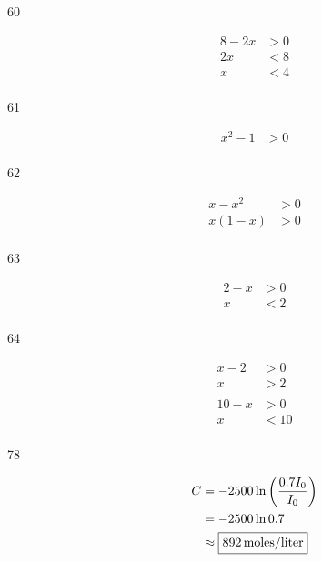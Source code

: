 \documentclass{exam}
\begin{document}
\begin{description}

    \item[60]
      \begin{align*}
        8 - 2x & > 0 \\
        2x     & < 8 \\
        x      & < 4 \\
      \end{align*}


    \item[61]
      \begin{align*}
        x^2 - 1 & > 0 \\
      \end{align*}


    \item[62]
      \begin{align*}
        x - x^2  & > 0 \\
        x(1 - x) & > 0 \\
      \end{align*}


    \item[63]
      \begin{align*}
        2 - x & > 0 \\
        x     & < 2 \\
      \end{align*}


    \item[64]
      \begin{align*}
        x-2 & >0 \\
        x   & >2 \\
        \\
        10 - x & > 0 \\
        x      & < 10 \\
      \end{align*}


    \item[78]
      \begin{align*}
        C &= -2500 \ln \left( \frac{0.7 I_0}{I_0} \right) \\
          &= -2500 \ln 0.7 \\
          &\approx \boxed{\unit[892]{moles/liter}} \\
      \end{align*}


\end{description}
\end{document}
